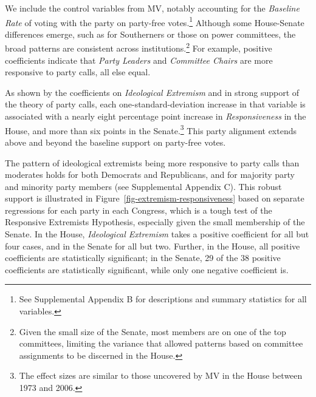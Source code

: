 \documentclass[12pt]{article}
\begin{document}
We include the control variables from MV, notably accounting for the
\textit{Baseline Rate} of voting with the party on party-free votes.\footnote{
  \doublespacing\normalsize
  See Supplemental Appendix B for descriptions and summary statistics for all
  variables.}
Although some House-Senate differences emerge, such as for Southerners or those
on power committees, the broad patterns are consistent across
institutions.\footnote{
  \doublespacing\normalsize
  Given the small size of the Senate, most members are on one of the top
  committees, limiting the variance that allowed patterns based on committee
  assignments to be discerned in the House.}
For example, positive coefficients indicate that \textit{Party Leaders} and
\textit{Committee Chairs} are more responsive to party calls, all else equal.

As shown by the coefficients on \textit{Ideological Extremism} and in strong
support of the theory of party calls, each one-standard-deviation increase in
that variable is associated with a nearly eight percentage point increase in
\textit{Responsiveness} in the House, and more than six points in the
Senate.\footnote{
  \doublespacing\normalsize
  The effect sizes are similar to those uncovered by MV in the House between
  1973 and 2006.}
This party alignment extends above and beyond the baseline support on
party-free votes.

The pattern of ideological extremists being more responsive to party calls than
moderates holds for both Democrats and Republicans, and for majority party and
minority party members (see Supplemental Appendix C).
This robust support is illustrated in Figure~\ref{fig-extremism-responsiveness}
based on separate regressions for each party in each Congress, which is a tough
test of the Responsive Extremists Hypothesis, especially given the small
membership of the Senate.
In the House, \textit{Ideological Extremism} takes a positive coefficient for
all but four cases, and in the Senate for all but two.
Further, in the House, all positive coefficients are statistically significant;
in the Senate, 29 of the 38 positive coefficients are statistically significant,
while only one negative coefficient is.
\end{document}
